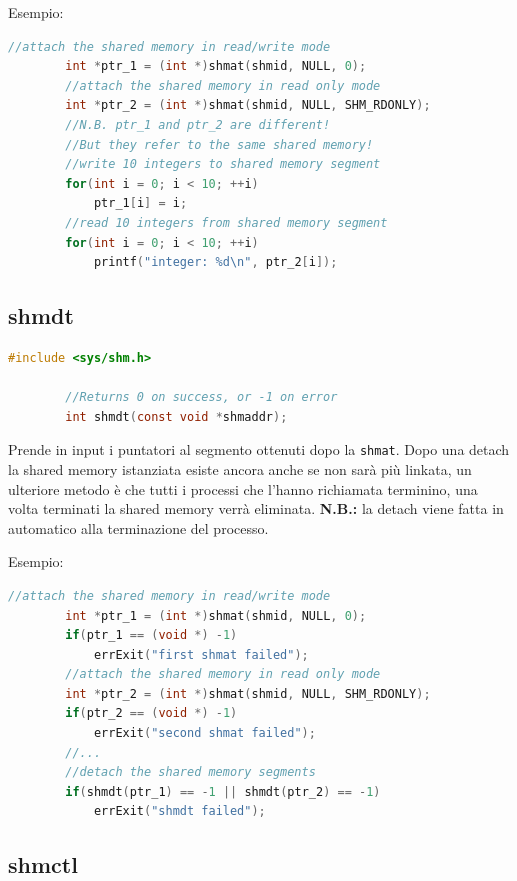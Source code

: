 \documentclass[a4paper, 12pt]{book}
\begin{document}
    Esempio:
    \begin{lstlisting}[language=C]
        //attach the shared memory in read/write mode 
        int *ptr_1 = (int *)shmat(shmid, NULL, 0);
        //attach the shared memory in read only mode 
        int *ptr_2 = (int *)shmat(shmid, NULL, SHM_RDONLY);
        //N.B. ptr_1 and ptr_2 are different!
        //But they refer to the same shared memory!
        //write 10 integers to shared memory segment 
        for(int i = 0; i < 10; ++i)
            ptr_1[i] = i;
        //read 10 integers from shared memory segment
        for(int i = 0; i < 10; ++i)
            printf("integer: %d\n", ptr_2[i]);
    \end{lstlisting}

    \subsection{shmdt}

    \begin{lstlisting}[language=C]
        #include <sys/shm.h>

        //Returns 0 on success, or -1 on error 
        int shmdt(const void *shmaddr);
    \end{lstlisting}
    Prende in input i puntatori al segmento ottenuti dopo 
    la \verb|shmat|. Dopo una detach la shared memory 
    istanziata esiste ancora anche se non sarà più 
    linkata, un ulteriore metodo è che tutti i processi 
    che l'hanno richiamata terminino, una volta terminati 
    la shared memory verrà eliminata. \textbf{N.B.:} la 
    detach viene fatta in automatico alla terminazione 
    del processo.

    Esempio:
    \begin{lstlisting}[language=C]
        //attach the shared memory in read/write mode 
        int *ptr_1 = (int *)shmat(shmid, NULL, 0);
        if(ptr_1 == (void *) -1)
            errExit("first shmat failed");
        //attach the shared memory in read only mode 
        int *ptr_2 = (int *)shmat(shmid, NULL, SHM_RDONLY);
        if(ptr_2 == (void *) -1)
            errExit("second shmat failed");
        //...
        //detach the shared memory segments 
        if(shmdt(ptr_1) == -1 || shmdt(ptr_2) == -1)
            errExit("shmdt failed");
    \end{lstlisting}

    \subsection{shmctl}
\end{document}
